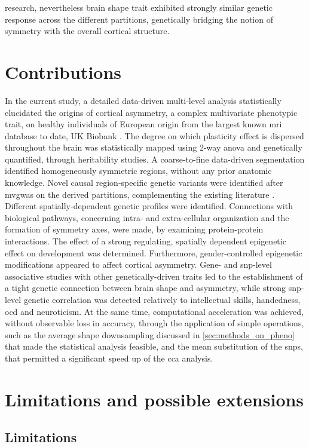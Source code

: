 research, nevertheless brain shape trait exhibited strongly similar genetic response \cite{Naqvi2021} across the different partitions, genetically bridging the notion of symmetry with the overall cortical structure. 

\section{Contributions}
In the current study, a detailed  data-driven multi-level analysis statistically elucidated the origins of cortical asymmetry, a complex multivariate phenotypic trait, on healthy individuals of European origin from the largest known \ac{mri} database to date, UK Biobank \cite{Littlejohns2020}. The degree on which plasticity effect is dispersed throughout the brain was statistically mapped using 2-way \ac{anova} and genetically quantified, through heritability studies. A coarse-to-fine data-driven segmentation identified homogeneously symmetric regions, without any prior anatomic knowledge.  Novel causal region-specific genetic variants were identified after \ac{mvgwas} on the derived partitions, complementing the existing literature \cite{Sha2021}. Different spatially-dependent genetic profiles were identified. Connections with biological pathways, concerning intra- and extra-cellular organization and the formation of symmetry axes, were made, by examining protein-protein interactions. The effect of a strong regulating, spatially dependent epigenetic effect on development was determined. Furthermore, gender-controlled epigenetic modifications appeared to affect cortical asymmetry. Gene- and \ac{snp}-level associative studies  with other genetically-driven traits led to the establishment of a tight genetic connection between  brain shape and asymmetry, while strong \ac{snp}-level genetic correlation was detected relatively to intellectual skills, handedness, \ac{ocd} and neuroticism. At the same time, computational acceleration was achieved, without observable loss in accuracy, through the application of simple operations, such as the average shape downsampling discussed in \autoref{sec:methods_on_pheno} that made the statistical analysis feasible, and the mean substitution of the \acp{snp}, that permitted a significant speed up of the \ac{cca} analysis.

\section{Limitations and possible extensions}
\subsection{Limitations}

